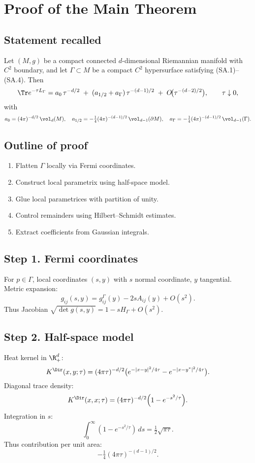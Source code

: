 \section{Proof of the Main Theorem}
\label{sec:proof-main}

\subsection{Statement recalled}
\begin{theorem}\label{thm:universal-law}
Let $(M,g)$ be a compact connected $d$-dimensional Riemannian manifold with $C^2$ boundary,
and let $\Gamma\subset M$ be a compact $C^2$ hypersurface satisfying (SA.1)--(SA.4).
Then
\[
\Tr e^{-\tau L_\Gamma}
= a_0\,\tau^{-d/2}\;+\;(a_{1/2}+a_\Gamma)\,\tau^{-(d-1)/2}\;+\;O\!\big(\tau^{-(d-2)/2}\big),
\qquad \tau\downarrow 0,
\]
with
\[
a_0=(4\pi)^{-d/2}\,\vol_d(M),\quad
a_{1/2}=-\tfrac14(4\pi)^{-(d-1)/2}\,\vol_{d-1}(\partial M),\quad
a_\Gamma=-\tfrac14(4\pi)^{-(d-1)/2}\,\vol_{d-1}(\Gamma).
\]
\end{theorem}

\subsection{Outline of proof}
\begin{enumerate}
\item Flatten $\Gamma$ locally via Fermi coordinates.
\item Construct local parametrix using half-space model.
\item Glue local parametrices with partition of unity.
\item Control remainders using Hilbert–Schmidt estimates.
\item Extract coefficients from Gaussian integrals.
\end{enumerate}

\subsection{Step 1. Fermi coordinates}
For $p\in\Gamma$, local coordinates $(s,y)$ with $s$ normal coordinate, $y$ tangential.
Metric expansion:
\[
g_{ij}(s,y)=g_{ij}^\Gamma(y)-2sA_{ij}(y)+O(s^2).
\]
Thus Jacobian $\sqrt{\det g(s,y)}=1-sH_\Gamma+O(s^2)$.

\subsection{Step 2. Half-space model}
Heat kernel in $\R^d_+$:
\[
K^\Dir(x,y;\tau)=(4\pi\tau)^{-d/2}\big(e^{-|x-y|^2/4\tau}-e^{-|x-y^*|^2/4\tau}\big).
\]
Diagonal trace density:
\[
K^\Dir(x,x;\tau)=(4\pi\tau)^{-d/2}\Big(1-e^{-s^2/\tau}\Big).
\]
Integration in $s$:
\[
\int_0^\infty (1-e^{-s^2/\tau})\,ds=\tfrac12\sqrt{\pi\tau}.
\]
Thus contribution per unit area:
\[
-\tfrac14(4\pi\tau)^{-(d-1)/2}.
\]

